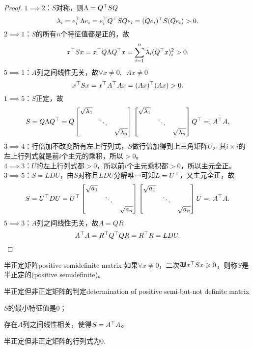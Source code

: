 \begin{proof}
	$1\implies 2$：$S$对称，则$\Lambda=Q^\top SQ$
	\[
		\lambda_i=e_i^\top \Lambda e_i=e_i^\top Q^\top SQe_i=(Qe_i)^\top S(Qe_i)>0.
	\]
	$2\implies 1$：$S$的所有$n$个特征值都是正的，故
	\[
		x^\top Sx=x^\top Q\Lambda Q^\top x=\sum_{i=1}^n\lambda_i(Q^\top x)^2_i>0.
	\]
	$5\implies 1$：$A$列之间线性无关，故$\forall x\neq 0,\enspace Ax\neq 0$
	\[
		x^\top Sx=x^\top A^\top Ax=(Ax)^\top(Ax)>0.
	\]
	$1\implies 5$：$S$正定，故
	\[
		S=Q\Lambda Q^\top=Q\begin{bmatrix}
			\sqrt{\lambda_1}\\ &\ddots\\ &&\sqrt{\lambda_n}
		\end{bmatrix}\begin{bmatrix}
			\sqrt{\lambda_1}\\ &\ddots\\ &&\sqrt{\lambda_n}
		\end{bmatrix}Q^\top=:A^\top A.
	\]
	$3\implies 4$：行倍加不改变所有左上行列式，$S$做行倍加得到上三角矩阵$U$，其$i\times i$的左上行列式就是前$i$个主元的乘积，所以$>0$。\\
	$4\implies 3$：$U$的左上行列式都$>0$，所以前$i$个主元乘积都$>0$，所以主元全正。\\
	$3\implies 5$：$S=LDU$，由$S$对称且$LDU$分解唯一可知$L=U^\top$，又主元全正，故
	\[
		S=U^\top DU=U^\top\begin{bmatrix}
			\sqrt{a_1}\\ &\ddots\\ &&\sqrt{a_n}
		\end{bmatrix}\begin{bmatrix}
			\sqrt{a_1}\\ &\ddots\\ &&\sqrt{a_n}
		\end{bmatrix}U=:A^\top A.
	\]
	$5\implies 3$：$A$列之间线性无关，故$A=QR$
	\[
		A^\top A=R^\top Q^\top QR=R^\top R=LDU.
	\]
\end{proof}
\begin{definition}{半正定矩阵}{positive semidefinite matrix}
	如果$\forall x\neq 0$，二次型$x^\top Sx\geqslant 0$，则称$S$是半正定的(positive semidefinite)。
\end{definition}
\begin{theorem}{半正定但非正定矩阵的判定}{determination of positive semi-but-not definite matrix}
	\begin{compactenum}
		\item $S$的最小特征值是0；
		\item 存在$A$列之间线性相关，使得$S=A^\top A$。
	\end{compactenum}
\end{theorem}
半正定但非正定矩阵的行列式为0.